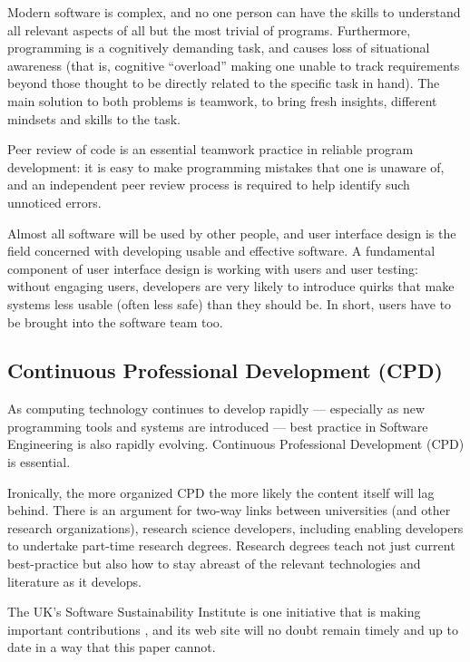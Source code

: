 \documentclass[10pt,a4paper]{article}
\begin{document}
Modern software is complex, and no one person can have the skills to understand all relevant aspects of all but the most trivial of programs. Furthermore, programming is a cognitively demanding task, and causes loss of situational awareness (that is, cognitive ``overload'' making one unable to track requirements beyond those thought to be directly related to the specific task in hand). The main solution to both problems is teamwork, to bring fresh insights, different mindsets and skills to the task.
 
Peer review of code is an essential teamwork practice in reliable program development: \cite{peerReview,knight} it is easy to make programming mistakes that one is unaware of, and an independent peer review process is required to help identify such unnoticed errors. 

Almost all software will be used by other people, and user interface design is the field concerned with developing usable and effective software. A fundamental component of user interface design is working with users and user testing: without engaging users, developers are very likely to introduce quirks that make systems less usable (often less safe) than they should be. In short, users have to be brought into the software team too.

\subsection{Continuous Professional Development (CPD)}

As computing technology continues to develop rapidly --- especially as new programming tools and systems are introduced --- best practice in Software Engineering is also rapidly evolving. Continuous Professional Development (CPD) is essential. 

Ironically, the more organized CPD the more likely the content itself will lag behind. There is an argument for two-way links between universities (and other research organizations), research science developers, including enabling developers to undertake part-time research degrees. Research degrees teach not just current best-practice but also how to stay abreast of the relevant technologies and literature as it develops.

The UK's Software Sustainability Institute is one initiative that is making important contributions \cite{ssi-report,ssi-url}, and its web site will no doubt remain timely and up to date in a way that this paper cannot.
\end{document}
